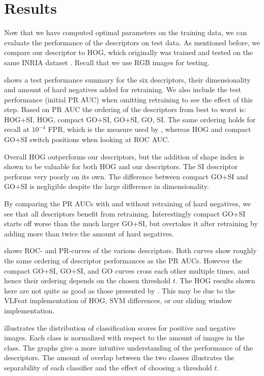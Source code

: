 \documentclass[thesis.tex]{subfiles}
\begin{document}
\section{Results}
%
Now that we have computed optimal parameters on the training data, we can evaluate the performance of the descriptors on test data. As mentioned before, we compare our descriptor to HOG, which originally was trained and tested on the same INRIA dataset \cite{dalal2005histograms}. Recall that we use RGB images for testing.

 shows a test performance summary for the six descriptors, their dimensionality and amount of hard negatives added for retraining. We also include the test performance (initial PR AUC) when omitting retraining to see the effect of this step. Based on PR AUC the ordering of the descriptors from best to worst is: HOG+SI, HOG, compact GO+SI, GO+SI, GO, SI. The same ordering holds for recall at $10^{-4}$ FPR, which is the measure used by \citet{dalal2005histograms}, whereas HOG and compact GO+SI switch positions when looking at ROC AUC.

Overall HOG outperforms our descriptors, but the addition of shape index is shown to be valuable for both HOG and our descriptors. The SI descriptor performs very poorly on its own. The difference between compact GO+SI and GO+SI is negligible despite the large difference in dimensionality.

By comparing the PR AUCs with and without retraining of hard negatives, we see that all descriptors benefit from retraining. Interestingly compact GO+SI starts off worse than the much larger GO+SI, but overtakes it after retraining by adding more than twice the amount of hard negatives.

 shows ROC- and PR-curves of the various descriptors. Both curves show roughly the same ordering of descriptor performances as the PR AUCs. However the compact GO+SI, GO+SI, and GO curves cross each other multiple times, and hence their ordering depends on the chosen threshold $t$. The HOG results shown here are not quite as good as those presented by \citet{dalal2005histograms}. This may be due to the VLFeat implementation of HOG, SVM differences, or our sliding window implementation.

 illustrates the distribution of classification scores for positive and negative images. Each class is normalized with respect to the amount of images in the class. The graphs give a more intuitive understanding of the performance of the descriptors. The amount of overlap between the two classes illustrates the separability of each classifier and the effect of choosing a threshold $t$.
\end{document}
